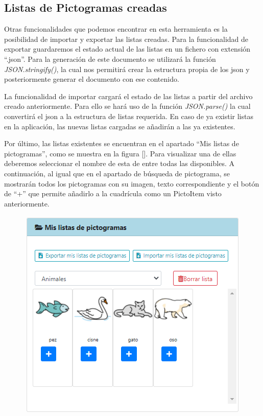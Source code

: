 \subsection{Listas de Pictogramas creadas}

Otras funcionalidades que podemos encontrar en esta herramienta es la posibilidad de importar y exportar las listas creadas.
Para la funcionalidad de exportar guardaremos el estado actual de las listas en un fichero con extensión “.json”. Para la generación de este documento se utilizará la función \textit{JSON.stringify()}, la cual nos permitirá crear la estructura propia de los json y posteriormente generar el documento con ese contenido.

La funcionalidad de importar cargará el estado de las listas a partir del archivo creado anteriormente. Para ello se hará uso de la función \textit{JSON.parse()} la cual convertirá el json a la estructura de listas requerida. En caso de ya existir listas en la aplicación, las nuevas listas cargadas se añadirán a las ya existentes. 

Por último, las listas existentes se encuentran en el apartado “Mis listas de pictogramas”, como se muestra en la figura []. Para visualizar una de ellas deberemos seleccionar el nombre de esta de entre todas las disponibles. A continuación, al igual que en el apartado de búsqueda de pictograma, se mostrarán todos los pictogramas con su imagen, texto correspondiente y el botón de “+” que permite añadirlo a la cuadrícula como un PictoItem visto anteriormente.

\begin{figure}[h!]
	\centering
	\includegraphics[width=0.7\linewidth]{Imagenes/Bitmap/lisaPictoSel}
	\caption{}
	\label{fig:lisapictosel}
\end{figure}


